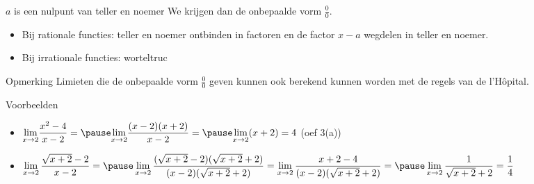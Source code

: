 \documentclass{beamer}
\newcommand{\ds}{\displaystyle}
\begin{document}
\begin{frame}
\begin{block}{$a$ is een nulpunt van teller en noemer}
We krijgen dan de
onbepaalde vorm $\frac{0}{0}$.
\begin{itemize}


\item Bij rationale functies: teller en noemer
ontbinden in factoren en de factor $x-a$ wegdelen in teller en
noemer. 

\item Bij irrationale functies: worteltruc
\end{itemize}


\end{block}
\begin{alertblock}{Opmerking}
Limieten die de onbepaalde vorm $\frac{0}{0}$ geven kunnen ook berekend kunnen worden met de regels van de l'H\^{o}pital. 
\end{alertblock}
\end{frame}
\begin{frame}
\begin{exampleblock}{Voorbeelden}
\begin{itemize}
	\item 
$\displaystyle{\lim_{x \to 2}} \frac{x^2 - 4 }{x-2}
= \pause \displaystyle{\lim_{x \to 2}} \frac{(x - 2)(x + 2) }{x-2} = \pause
\displaystyle{\lim_{x \to 2}} (x + 2) = 4 $ (oef 3(a))
\item 
$\ds \lim_{x \rightarrow 2} \frac {\sqrt{x+2} -2}{x-2} = \pause \lim_{x \rightarrow 2} \frac {(\sqrt{x+2} -2)(\sqrt{x+2} +2)}{(x-2)(\sqrt{x+2} +2)}= \lim_{x \rightarrow 2} \frac {x+2-4}{(x-2)(\sqrt{x+2} +2)}= \pause\lim_{x \rightarrow 2} \frac {1}{\sqrt{x+2} +2}=\frac14$
\end{itemize}
\end{exampleblock}
\end{frame}
\end{document}
